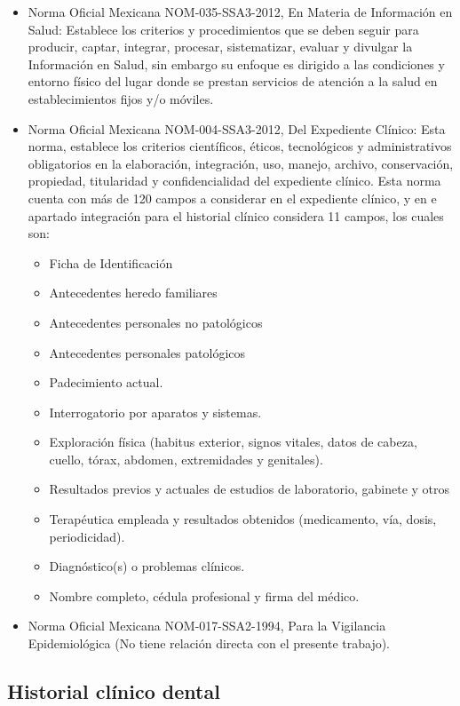 \begin{itemize}
    \item Norma Oficial Mexicana NOM-035-SSA3-2012, En Materia de Información en Salud: Establece los criterios y procedimientos que se deben seguir para producir, captar, integrar, procesar, sistematizar, evaluar y divulgar la Información en Salud, sin embargo su enfoque es dirigido a las condiciones y entorno físico del lugar donde se prestan servicios de atención a la salud en establecimientos fijos y/o móviles.
    \item Norma Oficial Mexicana NOM-004-SSA3-2012, Del Expediente Clínico: Esta norma, establece los criterios científicos, éticos, tecnológicos y administrativos obligatorios en la elaboración, integración, uso, manejo, archivo, conservación, propiedad, titularidad y confidencialidad del expediente clínico. Esta norma cuenta con más de 120 campos a considerar en el expediente clínico, y en e apartado integración para el historial clínico considera 11 campos, los cuales son:
    \begin{itemize}
        \item Ficha de Identificación
        \item Antecedentes heredo familiares
        \item Antecedentes personales no patológicos
        \item Antecedentes personales patológicos
\item Padecimiento actual.
\item Interrogatorio por aparatos y sistemas.
\item Exploración física (habitus exterior, signos vitales, datos de cabeza, cuello, tórax, abdomen, extremidades y genitales).
\item Resultados previos y actuales de estudios de laboratorio, gabinete y otros
\item Terapéutica empleada y resultados obtenidos (medicamento, vía, dosis, periodicidad).
\item Diagnóstico(s) o problemas clínicos.
\item Nombre completo, cédula profesional y firma del médico.
    \end{itemize}
    \item Norma Oficial Mexicana NOM-017-SSA2-1994, Para la Vigilancia Epidemiológica  (No tiene relación directa con el presente trabajo).
\end{itemize}




\subsection{Historial clínico dental}

